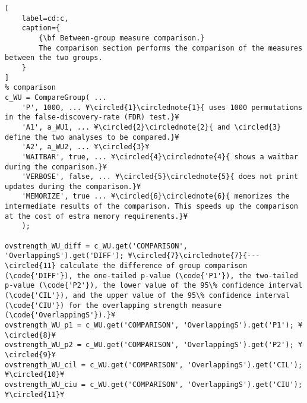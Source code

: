 \documentclass{tufte-handout}
\begin{document}
\begin{lstlisting}[
	label=cd:c,
	caption={
		{\bf Between-group measure comparison.}
		The comparison section performs the comparison of the measures between the two groups.
	}
]
% comparison
c_WU = CompareGroup( ...
    'P', 1000, ... ¥\circled{1}\circlednote{1}{ uses 1000 permutations in the false-discovery-rate (FDR) test.}¥
    'A1', a_WU1, ... ¥\circled{2}\circlednote{2}{ and \circled{3} define the two analyses to be compared.}¥
    'A2', a_WU2, ... ¥\circled{3}¥
    'WAITBAR', true, ... ¥\circled{4}\circlednote{4}{ shows a waitbar during the comparison.}¥
    'VERBOSE', false, ... ¥\circled{5}\circlednote{5}{ does not print updates during the comparison.}¥
    'MEMORIZE', true ... ¥\circled{6}\circlednote{6}{ memorizes the intermediate results of the comparison. This speeds up the comparison at the cost of estra memory requirements.}¥
    );

ovstrength_WU_diff = c_WU.get('COMPARISON', 'OverlappingS').get('DIFF'); ¥\circled{7}\circlednote{7}{---\circled{11} calculate the difference of group comparison (\code{'DIFF'}), the one-tailed p-value (\code{'P1'}), the two-tailed p-value (\code{'P2'}), the lower value of the 95\% confidence interval (\code{'CIL'}), and the upper value of the 95\% confidence interval (\code{'CIU'}) for the overlapping strength measure (\code{'OverlappingS'}).}¥
ovstrength_WU_p1 = c_WU.get('COMPARISON', 'OverlappingS').get('P1'); ¥\circled{8}¥
ovstrength_WU_p2 = c_WU.get('COMPARISON', 'OverlappingS').get('P2'); ¥\circled{9}¥
ovstrength_WU_cil = c_WU.get('COMPARISON', 'OverlappingS').get('CIL'); ¥\circled{10}¥
ovstrength_WU_ciu = c_WU.get('COMPARISON', 'OverlappingS').get('CIU'); ¥\circled{11}¥
\end{lstlisting}
\end{document}
